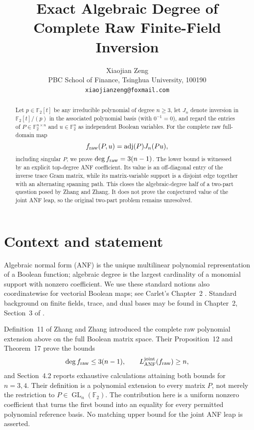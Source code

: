 \documentclass[11pt]{article}
\title{Exact Algebraic Degree of Complete Raw Finite-Field Inversion}
\author{Xiaojian Zeng\\
PBC School of Finance, Tsinghua University, 100190\\
\texttt{xiaojianzeng@foxmail.com}}
\date{}
\newcommand{\F}{\mathbb F}
\newcommand{\adj}{\operatorname{adj}}
\begin{document}
\maketitle

\begin{abstract}
Let $p\in\F_2[t]$ be any irreducible polynomial of degree $n\geq 3$,
let $J_n$ denote inversion in $\F_2[t]/(p)$ in the associated polynomial
basis (with $0^{-1}=0$), and regard the entries of
$P\in\F_2^{n\times n}$ and $u\in\F_2^n$ as independent Boolean variables.
For the complete raw full-domain map
\[
        f_{\rm raw}(P,u)=\adj(P)J_n(Pu),
\]
including singular $P$, we prove
$\deg f_{\rm raw}=3(n-1)$.  The lower bound is witnessed by an explicit
top-degree ANF coefficient.  Its value is an off-diagonal entry of the
inverse trace Gram matrix, while its matrix-variable support is a disjoint
edge together with an alternating spanning path.  This closes the
algebraic-degree half of a two-part question posed by Zhang and Zhang.  It
does not prove the conjectured value of the joint ANF leap, so the original
two-part problem remains unresolved.
\end{abstract}

\section{Context and statement}

Algebraic normal form (ANF) is the unique multilinear polynomial
representation of a Boolean function; algebraic degree is the largest
cardinality of a monomial support with nonzero coefficient.  We use these
standard notions also coordinatewise for vectorial Boolean maps; see
Carlet's Chapter~2 \cite{Carlet2021}.  Standard background on finite fields,
trace, and dual bases may be found in Chapter~2, Section~3 of
\cite{LidlNiederreiter1997}.

Definition~11 of Zhang and Zhang \cite{ZhangZhang2026} introduced the
complete raw polynomial extension above on the full Boolean matrix space.
Their Proposition~12 and Theorem~17 prove the bounds
\[
 \deg f_{\rm raw}\leq 3(n-1),\qquad
 L_{\rm ANF}^{\rm joint}(f_{\rm raw})\geq n,
\]
and Section~4.2 reports exhaustive calculations attaining both bounds for
$n=3,4$.  Their definition is a polynomial extension to every matrix $P$,
not merely the restriction to $P\in\operatorname{GL}_n(\F_2)$.  The contribution here is a
uniform nonzero coefficient that turns the first bound into an equality for
every permitted polynomial reference basis.  No matching upper bound for
the joint ANF leap is asserted.
\end{document}
